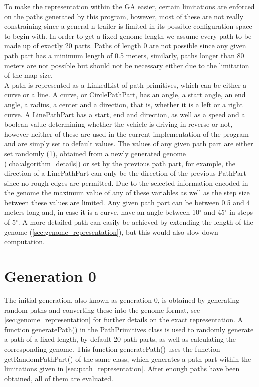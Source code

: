 To make the representation within the GA easier, certain limitations are enforced on the paths generated by this program, however, most of these are not really constraining since a general-n-trailer is limited in its possible configuration space to begin with. In order to get a fixed genome length we assume every path to be made up of exactly 20 parts. Paths of length 0 are not possible since any given path part has a minimum length of 0.5 meters, similarly, paths longer than 80 meters are not possible but should not be necessary either due to the limitation of the map-size.\\
A path is represented as a LinkedList of path primitives, which can be either a curve or a line. A curve, or CirclePathPart, has an angle, a start angle, an end angle, a radius, a center and a direction, that is, whether it is a left or a right curve. A LinePathPart has a start, end and direction, as well as a speed and a boolean value determining whether the vehicle is driving in reverse or not, however neither of these are used in the current implementation of the program and are simply set to default values. The values of any given path part are either set randomly (\ref{sec:generation_0}), obtained from a newly generated genome (\ref{cha:algorithm_details}) or set by the previous path part, for example, the direction of a LinePathPart can only be the direction of the previous PathPart since no rough edges are permitted.
Due to the selected information encoded in the genome the maximum value of any of these variables as well as the step size between these values are limited. Any given  path part can be between 0.5 and 4 meters long and, in case it is a curve, have an angle between 10$^{\circ}$ and 45$^{\circ}$ in steps of 5$^{\circ}$. A more detailed path can easily be achieved by extending the length of the genome (\ref{sec:genome_representation}), but this would also slow down computation.

\section{Generation 0} %
\label{sec:generation_0}

The initial generation, also known as generation 0, is obtained by generating random paths and converting these into the genome format, see \ref{sec:genome_representation} for further details on the exact representation. A function generatePath() in the PathPrimitives class is used to randomly generate a path of a fixed length, by default 20 path parts, as well as calculating the corresponding genome. This function generatePath() uses the function getRandomPathPart() of the same class, which generates a path part within the limitations given in \ref{sec:path_representation}.
After enough paths have been obtained, all of them are evaluated.


